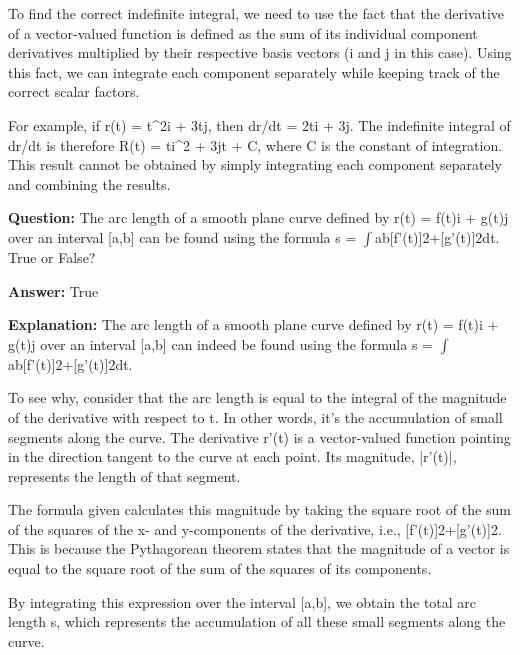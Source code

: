 \documentclass{article}
\begin{document}
To find the correct indefinite integral, we need to use the fact that the derivative of a vector-valued function is defined as the sum of its individual component derivatives multiplied by their respective basis vectors (i and j in this case). Using this fact, we can integrate each component separately while keeping track of the correct scalar factors.

For example, if r(t) = t{\textasciicircum}2i + 3tj, then dr/dt = 2ti + 3j. The indefinite integral of dr/dt is therefore R(t) = ti{\textasciicircum}2 + 3jt + C, where C is the constant of integration. This result cannot be obtained by simply integrating each component separately and combining the results.
                
                \vspace{0.5cm} 
        
            
                \textbf {Question:} The arc length of a smooth plane curve defined by r(t) = f(t)i + g(t)j over an interval [a,b] can be found using the formula s = \ensuremath{\int}ab[f'(t)]2+[g'(t)]2dt. True or False?
                
                \textbf{Answer:} True

                \textbf{Explanation:} The arc length of a smooth plane curve defined by r(t) = f(t)i + g(t)j over an interval [a,b] can indeed be found using the formula s = \ensuremath{\int}ab[f'(t)]2+[g'(t)]2dt.

To see why, consider that the arc length is equal to the integral of the magnitude of the derivative with respect to t. In other words, it's the accumulation of small segments along the curve. The derivative r'(t) is a vector-valued function pointing in the direction tangent to the curve at each point. Its magnitude, |r'(t)|, represents the length of that segment.

The formula given calculates this magnitude by taking the square root of the sum of the squares of the x- and y-components of the derivative, i.e., [f'(t)]2+[g'(t)]2. This is because the Pythagorean theorem states that the magnitude of a vector is equal to the square root of the sum of the squares of its components.

By integrating this expression over the interval [a,b], we obtain the total arc length s, which represents the accumulation of all these small segments along the curve.
                
                \vspace{0.5cm} 
        
\end{document}
